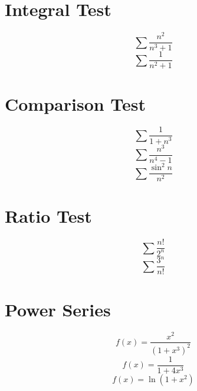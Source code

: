 \documentclass{article}
\begin{document}
\section{Integral Test}
\begin{equation}
	\sum
	\frac{n^2}{n^3+1}
\end{equation}
\vspace{3in}
\begin{equation}
	\sum
	\frac{1}
	{n^2+1}
\end{equation}
\pagebreak
\section{Comparison Test}
\begin{equation}
	\sum
	\frac
	{1}
	{1+n^3}
\end{equation}
\vspace{2in}
\begin{equation}
	\sum
	\frac
	{n^3}
	{n^4-1}
\end{equation}
\vspace{2in}
\begin{equation}
	\sum
	\frac
	{\sin^2n}
	{n^2}
\end{equation}
\pagebreak
\section{Ratio Test}
\begin{equation}
	\sum
	\frac
	{n!}
	{2^n}
\end{equation}
\vspace{3in}
\begin{equation}
	\sum
	\frac
	{3^n}
	{n!}
\end{equation}
\pagebreak
\section{Power Series}
\begin{equation}
	f(x)=
	\frac
	{x^2}
	{(1+x^3)^2}
\end{equation}
\vspace{3.5in}
\begin{equation}
	f(x)=
	\frac
	{1}
	{1+4x^3}
\end{equation}
\vspace{3.5in}
\begin{equation}
	f(x)=
	\ln(1+x^2)
\end{equation}
\pagebreak
\end{document}
